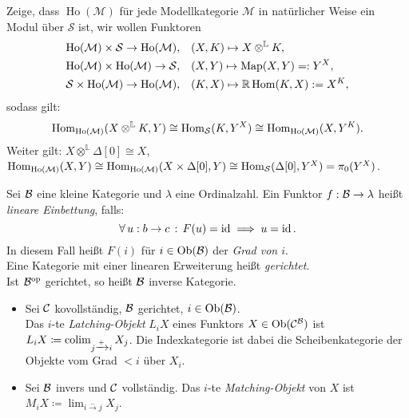 \documentclass{cheat-sheet}
\newcommand{\ModC}{\mathcal{M}} %
\DeclareMathOperator{\Ho}{Ho} %
\newcommand{\LL}{\mathbb{L}} %
\newcommand{\RD}[1]{\mathbb{R} #1} %
\newcommand{\Simpl}{\mathcal{S}} %
\begin{document}
\begin{ziel}
  Zeige, dass $\Ho(\ModC)$ für jede Modellkategorie $\ModC$ in natürlicher Weise ein Modul über $\Simpl$ ist, \dh{} wir wollen Funktoren
  \begin{align*}
    \Ho(\ModC) \times \Simpl \to \Ho(\ModC), \quad & (X, K) \mapsto X \otimes^\LL K, \\
    \Ho(\ModC) \times \Ho(\ModC) \to \Simpl, \quad & (X, Y) \mapsto \text{Map}(X, Y) =: Y^X, \\
    \Simpl \times \Ho(\ModC) \to \Ho(\ModC), \quad & (K, X) \mapsto \RD{\Hom(K, X)} := X^K,
  \end{align*}
  sodass gilt:
  \[ \Hom_{\Ho(\ModC)}(X \otimes^\LL K, Y) \cong \Hom_\Simpl(K, Y^X) \cong \Hom_{\Ho(\ModC)}(X, Y^K). \]
  Weiter gilt: $X \otimes^\LL \Delta[0] \cong X$, \dh{} $\Hom_{\Ho(\ModC)}(X, Y) \cong \Hom_{\Ho(\ModC)}(X \times \Delta[0], Y) \cong \Hom_\Simpl(\Delta[0], Y^X) = \pi_0(Y^X)$.
\end{ziel}


\begin{defn}
  Sei $\mathcal{B}$ eine kleine Kategorie und $\lambda$ eine Ordinalzahl.
  Ein Funktor $f : \mathcal{B} \to \lambda$ heißt \emph{lineare Einbettung}, falls:
  \[ \forall \, {u : b \to c} \,:\, F(u) = \operatorname{id} \implies u = \operatorname{id}. \]
  In diesem Fall heißt $F(i)$ für $i \in \operatorname{Ob}(\mathcal{B})$ der \emph{Grad von $i$}. \\
  Eine Kategorie mit einer linearen Erweiterung heißt \emph{gerichtet}. \\
  Ist $\mathcal{B}^{\mathrm{op}}$ gerichtet, so heißt $\mathcal{B}$ inverse Kategorie.
\end{defn}

\begin{defn}
  \begin{itemize}
    \item Sei $\mathcal{C}$ kovollständig, $\mathcal{B}$ gerichtet, $i \in \operatorname{Ob}(\mathcal{B})$. \\
    Das $i$-te \emph{Latching-Objekt} $L_i X$ eines Funktors $X \in \operatorname{Ob}(\mathcal{C}^{\mathcal{B}})$ ist $L_i X \coloneqq \operatorname{colim}_{j \xrightarrow{{+}} i} X_j$.
    Die Indexkategorie ist dabei die Scheibenkategorie der Objekte vom Grad $< i$ über $X_i$.
    \item Sei $\mathcal{B}$ invers und $\mathcal{C}$ vollständig. Das $i$-te \emph{Matching-Objekt} von $X$ ist
    $M_i X \coloneqq \lim_{i \xrightarrow{{-}} j} X_j$.
  \end{itemize}
\end{defn}
\end{document}
